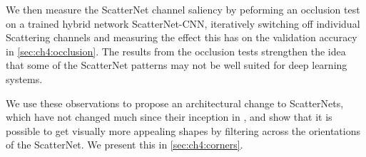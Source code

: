 We then measure the ScatterNet channel saliency by peforming an occlusion test
on a trained hybrid network ScatterNet-CNN, iteratively switching off individual
Scattering channels and measuring the effect this has on the validation accuracy
in \autoref{sec:ch4:occlusion}. The results from the occlusion tests strengthen
the idea that some of the ScatterNet patterns may not be well suited for deep 
learning systems.

We use these observations to propose an architectural change to ScatterNets,
which have not changed much since their inception in \cite{mallat_group_2012}, 
and show that it is possible to get visually more appealing shapes by filtering
across the orientations of the ScatterNet. We present this in
\autoref{sec:ch4:corners}.





